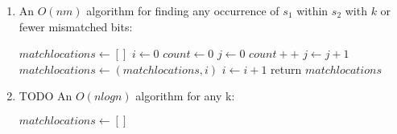 \documentclass[a4paper]{article}
\begin{document}
\begin{enumerate}
\begin{enumerate}
	\item An $O(nm)$ algorithm for finding any occurrence of $s_1$ within $s_2$ with $k$ or fewer mismatched bits:
		\begin{algorithmic}
		\State $matchlocations \gets [ ]$
		\State $i \gets 0$
			\State $count \gets 0$
			\State $j \gets 0$
					\State $count++$
				\EndIf
				\State $j \gets j + 1$
			\EndFor
				\State $matchlocations \gets (matchlocations, i)$
			\EndIf
			\State $i \gets i + 1$
		\EndFor
		\State return $matchlocations$
		\end{algorithmic}
	\item TODO An $O(n log n)$ algorithm for any k:
		\begin{algorithmic}
		\State $matchlocations \gets [ ]$
		

\end{algorithmic}
\end{enumerate}
\end{enumerate}
\end{document}
